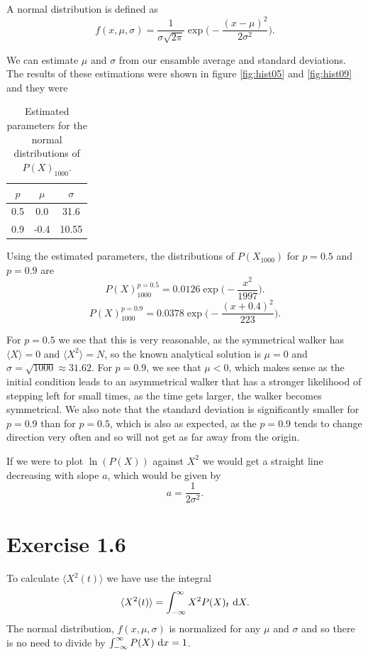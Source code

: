 \documentclass[a4paper, 11pt, notitlepage, english]{article}
\renewcommand{\d}{{\rm d}}
\begin{document}
\clearpage

A normal distribution is defined as
$$f(x, \mu, \sigma) = \frac{1}{\sigma\sqrt{2\pi}}\exp\bigg(-\frac{(x-\mu)^2}{2\sigma^2}\bigg).$$

We can estimate $\mu$ and $\sigma$ from our ensamble average and standard deviations. The results of these estimations were shown in figure \ref{fig:hist05} and \ref{fig:hist09} and they were

\begin{table}[h!tpb]
\begin{center}
\begin{tabular}{|c|c|c|}
\hline
$p$  & $\mu$ & $\sigma$ \\ \hline 
0.5 & 0.0 & 31.6 \\ \hline
0.9 & -0.4 & 10.55 \\ \hline
\end{tabular}
\caption{Estimated parameters for the normal distributions of $P(X)_{1000}$.}
\end{center}
\end{table}

Using the estimated parameters, the distributions of $P(X_{1000})$ for $p=0.5$ and $p=0.9$ are
$$P(X)_{1000}^{p=0.5} = 0.0126\exp\bigg(-\frac{x^2}{1997}\bigg).$$
$$P(X)_{1000}^{p=0.9} = 0.0378\exp\bigg(-\frac{(x+0.4)^2}{223}\bigg).$$

For $p=0.5$ we see that this is very reasonable, as the symmetrical walker has $\langle X \rangle = 0$ and $\langle X^2 \rangle = N$, so the known analytical solution is $\mu =0$ and $\sigma = \sqrt{1000} \approx 31.62$. For $p=0.9$, we see that $\mu < 0$, which makes sense as the initial condition leads to an asymmetrical walker that has a stronger likelihood of stepping left for small times, as the time gets larger, the walker becomes symmetrical. We also note that the standard deviation is significantly smaller for $p=0.9$ than for $p=0.5$, which is also as expected, as the $p=0.9$ tends to change direction very often and so will not get as far away from the origin.

If we were to plot $\ln(P(X))$ against $X^2$ we would get a straight line decreasing with slope $a$, which would be given by 
$$a = \frac{1}{2\sigma^2}.$$

\clearpage

\section*{Exercise 1.6}
To calculate $\langle X^2(t) \rangle$ we have use the integral
$$\langle X^2(t) \rangle = \int_{-\infty}^\infty X^2 P(X)_t \ \d X.$$
The normal distribution, $f(x,\mu,\sigma)$ is normalized for any $\mu$ and $\sigma$ and so there is no need to divide by $\int_{-\infty}^\infty P(X) \ \d x = 1$.
\end{document}
